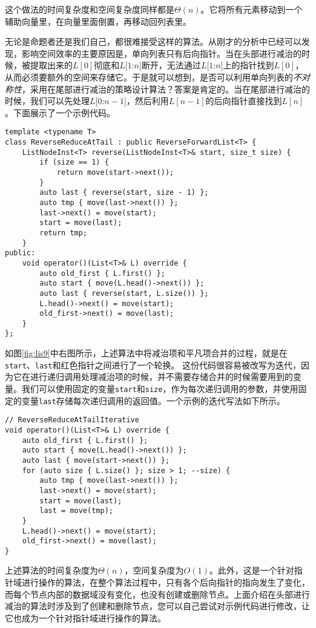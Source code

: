 这个做法的时间复杂度和空间复杂度同样都是$\Theta(n)$。它将所有元素移动到一个辅助向量里，在向量里面倒置，再移动回列表里。

无论是命题者还是我们自己，都很难接受这样的算法。从刚才的分析中已经可以发现，影响空间效率的主要原因是，单向列表只有后向指针。当在头部进行减治的时候，被提取出来的$L[0]$彻底和$L[1$:$n]$断开，无法通过$L[1$:$n]$上的指针找到$L[0]$，从而必须要额外的空间来存储它。于是就可以想到，是否可以利用单向列表的\textit{不对称性}，采用在尾部进行减治的策略设计算法？答案是肯定的。当在尾部进行减治的时候，我们可以先处理$L[0$:$n-1]$，然后利用$L[n-1]$的后向指针直接找到$L[n]$。下面展示了一个示例代码。

\begin{lstlisting}
template <typename T>
class ReverseReduceAtTail : public ReverseForwardList<T> {
    ListNodeInst<T> reverse(ListNodeInst<T>& start, size_t size) {
        if (size == 1) {
            return move(start->next());
        }
        auto last { reverse(start, size - 1) };
        auto tmp { move(last->next()) };
        last->next() = move(start);
        start = move(last);
        return tmp;
    }
public:
    void operator()(List<T>& L) override {
        auto old_first { L.first() };
        auto start { move(L.head()->next()) };
        auto last { reverse(start, L.size()) };
        L.head()->next() = move(start);
        old_first->next() = move(last);
    }
};
\end{lstlisting}

如图\ref{fig:lis9}中右图所示，上述算法中将减治项和平凡项合并的过程，就是在\lstinline{start}、\lstinline{last}和红色指针之间进行了一个轮换。
这份代码很容易被改写为迭代，因为它在进行递归调用处理减治项的时候，并不需要存储合并的时候需要用到的变量。我们可以使用固定的变量\lstinline{start}和\lstinline{size}，作为每次递归调用的参数，并使用固定的变量\lstinline{last}存储每次递归调用的返回值。一个示例的迭代写法如下所示。

\begin{lstlisting}
// ReverseReduceAtTailIterative
void operator()(List<T>& L) override {
    auto old_first { L.first() };
    auto start { move(L.head()->next()) };
    auto last { move(start->next()) };
    for (auto size { L.size() }; size > 1; --size) {
        auto tmp { move(last->next()) };
        last->next() = move(start);
        start = move(last);
        last = move(tmp);
    }
    L.head()->next() = move(start);
    old_first->next() = move(last);
}
\end{lstlisting}

上述算法的时间复杂度为$\Theta(n)$，空间复杂度为$O(1)$。此外，这是一个针对指针域进行操作的算法，在整个算法过程中，只有各个后向指针的指向发生了变化，而每个节点内部的数据域没有变化，也没有创建或删除节点。上面介绍在头部进行减治的算法时涉及到了创建和删除节点，您可以自己尝试对示例代码进行修改，让它也成为一个针对指针域进行操作的算法。

